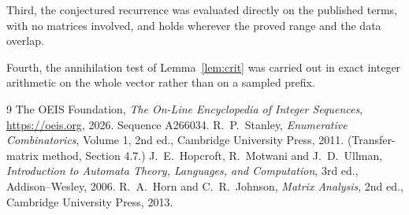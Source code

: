 \documentclass[11pt,a4paper]{article}
\theoremstyle{plain}
\theoremstyle{definition}
\begin{document}
Third, the conjectured recurrence was evaluated directly on the published terms, with no
matrices involved, and holds wherever the proved range and the data overlap.

Fourth, the annihilation test of Lemma~\ref{lem:crit} was carried out in exact integer
arithmetic on the whole vector rather than on a sampled prefix.

\begin{thebibliography}{9}
 The OEIS Foundation, \emph{The On-Line Encyclopedia of Integer
Sequences}, \url{https://oeis.org}, 2026. Sequence A266034.
 R.~P.~Stanley, \emph{Enumerative Combinatorics}, Volume 1, 2nd ed.,
Cambridge University Press, 2011. (Transfer-matrix method, Section 4.7.)
 J.~E.~Hopcroft, R.~Motwani and J.~D.~Ullman, \emph{Introduction to Automata
Theory, Languages, and Computation}, 3rd ed., Addison--Wesley, 2006.
 R.~A.~Horn and C.~R.~Johnson, \emph{Matrix Analysis}, 2nd ed., Cambridge
University Press, 2013.
\end{thebibliography}
\end{document}
